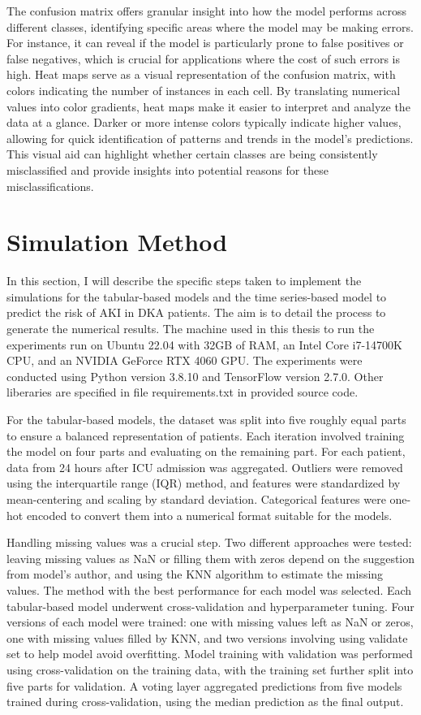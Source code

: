 \documentclass[../main.tex]{subfiles}
\begin{document}
The confusion matrix offers granular insight into how the model performs across different classes, identifying specific areas where the model may be making errors.
For instance, it can reveal if the model is particularly prone to false positives or false negatives, which is crucial for applications where the cost of such errors is high.
Heat maps serve as a visual representation of the confusion matrix, with colors indicating the number of instances in each cell.
By translating numerical values into color gradients, heat maps make it easier to interpret and analyze the data at a glance.
Darker or more intense colors typically indicate higher values, allowing for quick identification of patterns and trends in the model's predictions.
This visual aid can highlight whether certain classes are being consistently misclassified and provide insights into potential reasons for these misclassifications.


\section{Simulation Method}

In this section, I will describe the specific steps taken to implement the simulations for the tabular-based models and the time series-based model to predict the risk of \gls{AKI} in \gls{DKA} patients.
The aim is to detail the process to generate the numerical results.
The machine used in this thesis to run the experiments run on Ubuntu 22.04 with 32GB of RAM, an Intel Core i7-14700K CPU, and an NVIDIA GeForce RTX 4060 GPU. 
The experiments were conducted using Python version 3.8.10 and TensorFlow version 2.7.0. 
Other liberaries are specified in file requirements.txt in provided source code.

For the tabular-based models, the dataset was split into five roughly equal parts to ensure a balanced representation of patients.
Each iteration involved training the model on four parts and evaluating on the remaining part.
For each patient, data from 24 hours after \gls{ICU} admission was aggregated.
Outliers were removed using the interquartile range (IQR) method, and features were standardized by mean-centering and scaling by standard deviation.
Categorical features were one-hot encoded to convert them into a numerical format suitable for the models.

Handling missing values was a crucial step.
Two different approaches were tested: leaving missing values as NaN or filling them with zeros depend on the suggestion from model's author, and using the \gls{KNN} algorithm to estimate the missing values.
The method with the best performance for each model was selected.
Each tabular-based model underwent cross-validation and hyperparameter tuning.
Four versions of each model were trained: one with missing values left as NaN or zeros, one with missing values filled by KNN, and two versions involving using validate set to help model avoid overfitting.
Model training with validation was performed using cross-validation on the training data, with the training set further split into five parts for validation.
A voting layer aggregated predictions from five models trained during cross-validation, using the median prediction as the final output.
\end{document}
